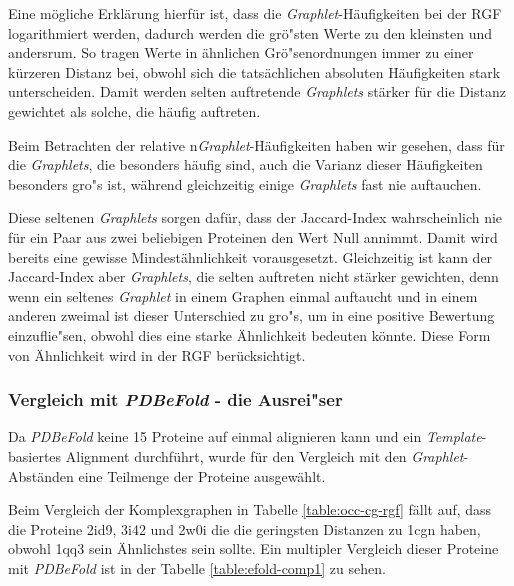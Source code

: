 \documentclass{report}
\begin{document}
Eine m\"ogliche Erkl\"arung hierf\"ur ist, dass die \textit{Graphlet}-H\"aufigkeiten bei der RGF logarithmiert werden, dadurch werden die gr\"o"sten Werte zu den kleinsten und andersrum.
So tragen Werte in \"ahnlichen Gr\"o"senordnungen immer zu einer k\"urzeren Distanz bei, obwohl sich die tats\"achlichen absoluten H\"aufigkeiten stark unterscheiden. Damit werden selten auftretende \textit{Graphlets} st\"arker f\"ur die Distanz gewichtet als solche, die h\"aufig auftreten. 



Beim Betrachten der relative n\textit{Graphlet}-H\"aufigkeiten haben wir gesehen, dass f\"ur die \textit{Graphlets}, die besonders h\"aufig sind, auch die Varianz dieser H\"aufigkeiten besonders gro"s ist, w\"ahrend gleichzeitig einige \textit{Graphlets} fast nie auftauchen.

Diese seltenen \textit{Graphlets} sorgen daf\"ur, dass der Jaccard-Index wahrscheinlich nie f\"ur ein Paar aus zwei beliebigen Proteinen den Wert Null annimmt. Damit wird bereits eine gewisse Mindest\"ahnlichkeit vorausgesetzt. Gleichzeitig ist kann der Jaccard-Index aber \textit{Graphlets}, die selten auftreten nicht st\"arker gewichten, denn wenn ein seltenes \textit{Graphlet} in einem Graphen einmal auftaucht und in einem anderen zweimal ist dieser Unterschied zu gro"s, um in eine positive Bewertung einzuflie"sen, obwohl dies eine starke \"Ahnlichkeit bedeuten k\"onnte.
Diese Form von \"Ahnlichkeit wird in der RGF ber\"ucksichtigt.

\subsubsection{Vergleich mit \textit{PDBeFold} - die Ausrei"ser}

Da \textit{PDBeFold} keine 15 Proteine auf einmal alignieren kann und ein \textit{Template}-basiertes Alignment durchf\"uhrt, wurde f\"ur den Vergleich mit den \textit{Graphlet}-Abst\"anden eine Teilmenge der Proteine ausgew\"ahlt.


Beim Vergleich der Komplexgraphen in Tabelle \ref{table:occ-cg-rgf} f\"allt auf, dass die Proteine 2id9, 3i42 und 2w0i die die geringsten Distanzen zu 1cgn haben, obwohl  1qq3 sein \"Ahnlichstes sein sollte. Ein multipler Vergleich dieser Proteine mit \textit{PDBeFold} ist in der Tabelle \ref{table:efold-comp1} zu sehen.
\end{document}
